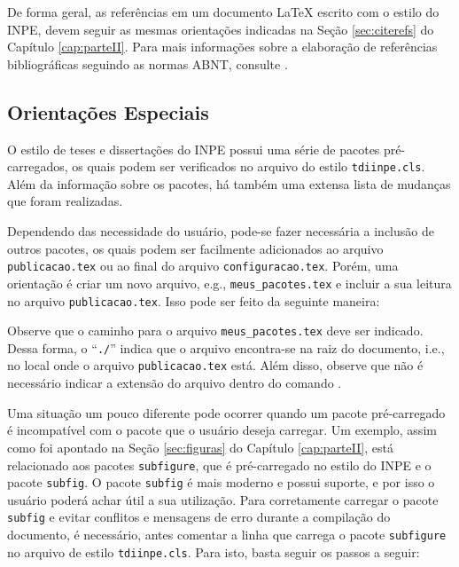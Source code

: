 De forma geral, as referências em um documento \LaTeX{} escrito com o estilo do INPE, devem seguir as mesmas orientações indicadas na Seção \ref{sec:citerefs} do Capítulo \ref{cap:parteII}. Para mais informações sobre a elaboração de referências bibliográficas seguindo as normas ABNT, consulte .

\subsection{Orientações Especiais}
\label{sec:oriesp}

O estilo de teses e dissertações do INPE possui uma série de pacotes pré-carregados, os quais podem ser verificados no arquivo do estilo {\tt tdiinpe.cls}. Além da informação sobre os pacotes, há também uma extensa lista de mudanças que foram realizadas.

Dependendo das necessidade do usuário, pode-se fazer necessária a inclusão de outros pacotes, os quais podem ser facilmente adicionados ao arquivo {\tt publicacao.tex} ou ao final do arquivo {\tt configuracao.tex}. Porém, uma orientação é criar um novo arquivo, e.g., {\tt meus\_pacotes.tex} e incluir a sua leitura no arquivo {\tt publicacao.tex}. Isso pode ser feito da seguinte maneira:

\begingroup
\renewcommand{\labelenumi}{\arabic{enumi}.}
\endgroup

Observe que o caminho para o arquivo {\tt meus\_pacotes.tex} deve ser indicado. Dessa forma, o ``{\tt ./}'' indica que o arquivo encontra-se na raiz do documento, i.e., no local onde o arquivo {\tt publicacao.tex} está. Além disso, observe que não é necessário indicar a extensão do arquivo dentro do comando \texttt{}.

Uma situação um pouco diferente pode ocorrer quando um pacote pré-carregado é incompatível com o pacote que o usuário deseja carregar. Um exemplo, assim como foi apontado na Seção \ref{sec:figuras} do Capítulo \ref{cap:parteII}, está relacionado aos pacotes {\tt subfigure}, que é pré-carregado no estilo do INPE e o pacote {\tt subfig}. O pacote {\tt subfig} é mais moderno e possui suporte, e por isso o usuário poderá achar útil a sua utilização. Para corretamente carregar o pacote {\tt subfig} e evitar conflitos e mensagens de erro durante a compilação do documento, é necessário, antes comentar a linha que carrega o pacote {\tt subfigure} no arquivo de estilo {\tt tdiinpe.cls}. Para isto, basta seguir os passos a seguir:


